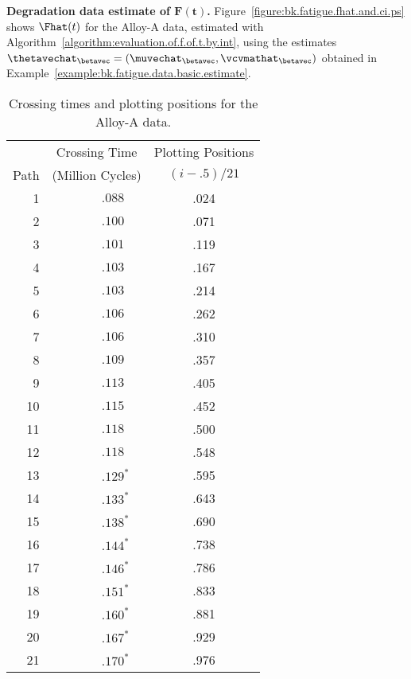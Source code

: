 \begin{example}{\bfseries Degradation data estimate of $\boldsymbol{F(t)}$.}
\label{example:bk.degradation.fhat}
Figure~\ref{figure:bk.fatigue.fhat.and.ci.ps} shows $\Fhat(t)$ for
the Alloy-A data, estimated with
Algorithm~\ref{algorithm:evaluation.of.f.of.t.by.int}, using the
estimates
$\thetavechat_{\betavec}=(\muvechat_{\betavec},\vcvmathat_{\betavec})$
obtained in Example~\ref{example:bk.fatigue.data.basic.estimate}.
\begin{table}
\caption{Crossing times and plotting positions for the Alloy-A data.}
\centering\small 
\begin{tabular}{rrrrlc}
\multicolumn{1}{c}{} & \multicolumn{4}{c}{Crossing
 Time} & \multicolumn{1}{c}{Plotting Positions} \\
\multicolumn{1}{c}{Path} & \multicolumn{4}{c}{(Million
Cycles)} & \multicolumn{1}{c}{$(i-.5)/21$} \\
\hline
 1 &&&& $.088$ & .024 \\
 2 &&&& $.100$ & .071 \\
 3 &&&& $.101$ & .119 \\
 4 &&&& $.103$ & .167 \\
 5 &&&& $.103$ & .214 \\
 6 &&&& $.106$ & .262 \\
 7 &&&& $.106$ & .310 \\
 8 &&&& $.109$ & .357 \\
 9 &&&& $.113$ & .405 \\
10 &&&& $.115$ & .452 \\
11 &&&& $.118$ & .500 \\
12 &&&& $.118$ & .548 \\
13 &&&& $.129^{*}$  &       .595 \\
14 &&&& $.133^{*}$  &       .643 \\
15 &&&& $.138^{*}$ &        .690    \\
16 &&&& $.144^{*}$  &       .738    \\
17 &&&& $.146^{*}$  &       .786    \\
18 &&&& $.151^{*}$  &       .833    \\
19 &&&& $.160^{*}$  &       .881    \\
20 &&&& $.167^{*}$ &        .929    \\
21 &&&& $.170^{*}$  &       .976    \\
\hline
\end{tabular}\\
\begin{minipage}[t]{4in}

\end{minipage}
\end{table}
\end{example}
